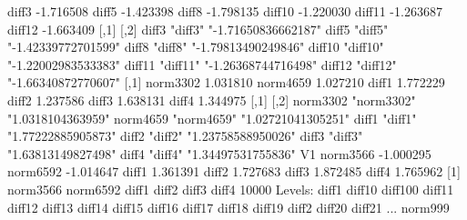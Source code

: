 \documentclass[a4paper,12pt]{article}
\begin{document}
\begin{scriptsize}
\begin{Schunk}
\begin{Soutput}
            [,1]
diff3  -1.716508
diff5  -1.423398
diff8  -1.798135
diff10 -1.220030
diff11 -1.263687
diff12 -1.663409
       [,1]     [,2]               
diff3  "diff3"  "-1.71650836662187"
diff5  "diff5"  "-1.42339772701599"
diff8  "diff8"  "-1.79813490249846"
diff10 "diff10" "-1.22002983533383"
diff11 "diff11" "-1.26368744716498"
diff12 "diff12" "-1.66340872770607"
             [,1]
norm3302 1.031810
norm4659 1.027210
diff1    1.772229
diff2    1.237586
diff3    1.638131
diff4    1.344975
         [,1]       [,2]              
norm3302 "norm3302" "1.0318104363959" 
norm4659 "norm4659" "1.02721041305251"
diff1    "diff1"    "1.77222885905873"
diff2    "diff2"    "1.23758588950026"
diff3    "diff3"    "1.63813149827498"
diff4    "diff4"    "1.34497531755836"
                V1
norm3566 -1.000295
norm6592 -1.014647
diff1     1.361391
diff2     1.727683
diff3     1.872485
diff4     1.765962
[1] norm3566 norm6592 diff1    diff2    diff3    diff4   
10000 Levels: diff1 diff10 diff100 diff11 diff12 diff13 diff14 diff15 diff16 diff17 diff18 diff19 diff2 diff20 diff21 ... norm999
\end{Soutput}
\end{Schunk}
\end{scriptsize}
%
%
%
\end{document}
